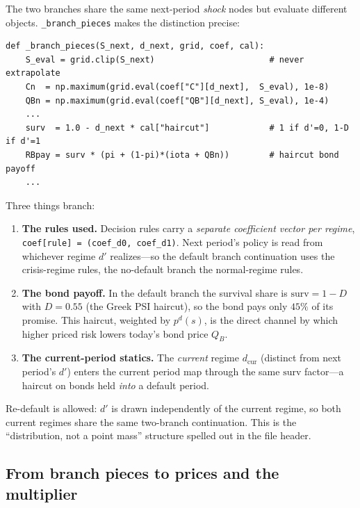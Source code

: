 \documentclass[11pt]{article}
\newcommand{\code}[1]{\texttt{#1}}
\begin{document}
The two branches share the same next-period \emph{shock} nodes but evaluate
different objects. \code{\_branch\_pieces} makes the distinction precise:
\begin{verbatim}
def _branch_pieces(S_next, d_next, grid, coef, cal):
    S_eval = grid.clip(S_next)                       # never extrapolate
    Cn  = np.maximum(grid.eval(coef["C"][d_next],  S_eval), 1e-8)
    QBn = np.maximum(grid.eval(coef["QB"][d_next], S_eval), 1e-4)
    ...
    surv  = 1.0 - d_next * cal["haircut"]            # 1 if d'=0, 1-D if d'=1
    RBpay = surv * (pi + (1-pi)*(iota + QBn))        # haircut bond payoff
    ...
\end{verbatim}
Three things branch:
\begin{enumerate}
\item \textbf{The rules used.} Decision rules carry a \emph{separate
      coefficient vector per regime}, \code{coef[rule] = (coef\_d0,
      coef\_d1)}. Next period's policy is read from whichever regime $d'$
      realizes---so the default branch continuation uses the crisis-regime
      rules, the no-default branch the normal-regime rules.
\item \textbf{The bond payoff.} In the default branch the survival share is
      $\text{surv}=1-D$ with $D=0.55$ (the Greek PSI haircut), so the bond
      pays only $45\%$ of its promise. This haircut, weighted by $p^d(s)$,
      is the direct channel by which higher priced risk lowers today's bond
      price $Q_B$.
\item \textbf{The current-period statics.} The \emph{current} regime
      $d_{\text{cur}}$ (distinct from next period's $d'$) enters the current
      period map through the same $\text{surv}$ factor---a haircut on bonds
      held \emph{into} a default period.
\end{enumerate}
Re-default is allowed: $d'$ is drawn independently of the current regime, so
both current regimes share the same two-branch continuation. This is the
``distribution, not a point mass'' structure spelled out in the file header.

\subsection{From branch pieces to prices and the multiplier}
\end{document}

